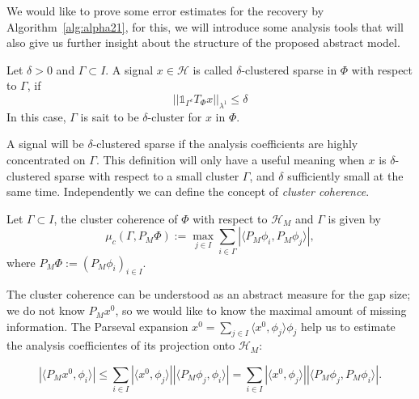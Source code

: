 \bigskip

We would like to prove some error estimates for the recovery by Algorithm~\ref{alg:alpha21}, for this, we will introduce some analysis tools that will also give us further insight about the structure of the proposed abstract model.

\bigskip

\begin{defn}
\label{def:alpha22}
Let $\delta>0$ and $\Gamma\subset I$. A signal $x\in\mathcal{H}$ is called $\delta$-clustered sparse in $\Phi$ with respect to $\Gamma$, if
\begin{equation}
\label{eq:alpha22}
||\mathbb{1}_{\Gamma^c}T_{\Phi}x||_{\lambda^1}\leq \delta
\end{equation}
In this case, $\Gamma$ is sait to be $\delta$-cluster for $x$ in $\Phi$. 
\end{defn}

\bigskip

A signal will be $\delta$-clustered sparse if the analysis coefficients are highly concentrated on $\Gamma$. This definition will only have a useful meaning when $x$ is $\delta$-clustered sparse with respect to a small cluster $\Gamma$, and $\delta$ sufficiently small at the same time. Independently we can define the concept of \textit{cluster coherence}.

\bigskip

\begin{defn}
Let $\Gamma\subset I$, the cluster coherence of $\Phi$ with respect to $\mathcal{H}_M$ and $\Gamma$ is given by 
$$
\mu_c(\Gamma,P_M\Phi):=\max_{j\in I}\sum_{i\in\Gamma}|\langle P_M\phi_i,P_M\phi_j\rangle|,
$$
where $P_M\Phi:=(P_M\phi_i)_{i\in I}$.
\end{defn}

\bigskip

The cluster coherence can be understood as an abstract measure for the gap size; we do not know $P_Mx^0$, so we would like to know the maximal amount of missing information. The Parseval expansion $x^0=\sum_{j\in I}\langle x^0,\phi_j\rangle \phi_j$ help us to estimate the analysis coefficientes of its projection onto $\mathcal{H}_M$:

\begin{equation}
\label{eq:alpha23}
|\langle P_Mx^0,\phi_i\rangle|\leq\sum_{i\in I}|\langle x^0,\phi_j\rangle||\langle P_M\phi_j,\phi_i\rangle|=\sum_{i\in I}|\langle x^0,\phi_j\rangle||\langle P_M\phi_j, P_M\phi_i\rangle|.
\end{equation}

